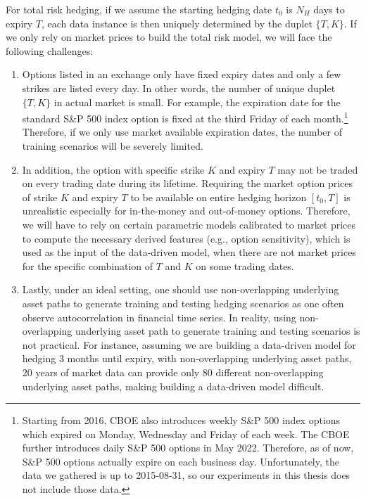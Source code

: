 \documentclass[letterpaper,12pt,titlepage,oneside,final]{book}
\numberwithin{equation}{section}
\theoremstyle{definition}
\begin{document}
For total risk hedging, if we assume the starting hedging date $t_0$ is $N_H$ days to expiry $T$, each data instance is then uniquely determined by the duplet $\{T,K\}$. If we only rely on market prices to build the total risk model,  we will face the following challenges:
\begin{enumerate}
	\item Options listed in an exchange only have fixed expiry dates and only a few strikes are listed every day. In other words, the number of unique duplet $\{T,K\}$ in actual market is small.		
	For example, the expiration date for the standard S\&P 500 index option is fixed at the third Friday of each month.\footnote{Starting from 2016, CBOE also introduces weekly S\&P 500 index options which expired on Monday, Wednesday and Friday of each week. The CBOE further introduces daily S\&P 500 options in May 2022. Therefore, as of now, S\&P 500 options actually expire on each business day. Unfortunately, the data we gathered is up to 2015-08-31, so our experiments in this thesis does not include those data.} Therefore, if we only use market available expiration dates, the number of training scenarios will  be severely limited. 
	\item In addition, the option with specific strike $K$ and expiry $T$ may not be traded  on every trading date during its lifetime. Requiring the market option prices of strike $K$ and expiry $T$ to be available on entire hedging horizon $[t_0, T]$ is unrealistic especially for in-the-money and out-of-money options. 
	Therefore, we will have to rely on certain parametric models calibrated to market prices to compute the necessary derived features (e.g., option sensitivity), which is used as the input of the data-driven model, when there are not market prices for the specific combination of $T$ and $K$ on some trading dates.
	\item Lastly, under an ideal setting, one should  use non-overlapping underlying asset paths to generate training and testing hedging scenarios as one often observe autocorrelation in financial time series.  In reality, using non-overlapping underlying asset path to generate training and testing scenarios is not practical. For instance, assuming we are building a data-driven model for hedging 3
	months until expiry, with non-overlapping underlying asset paths, 20 years of market data can provide only 80 different non-overlapping underlying asset paths, making building a
	data-driven model difficult.  
\end{enumerate}
\end{document}
